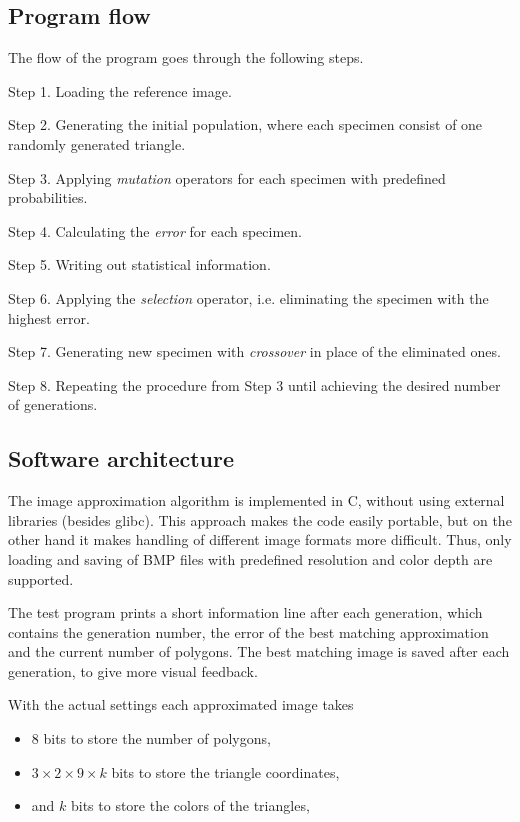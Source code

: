 \documentclass[conference]{IEEEtran}
\begin{document}
\subsection{Program flow}

The flow of the program goes through the following steps.

Step 1. Loading the reference image.

Step 2. Generating the initial population, where each specimen
consist of one randomly generated triangle.

Step 3. Applying \emph{mutation} operators for each specimen
with predefined probabilities.

Step 4. Calculating the \emph{error} for each specimen.

Step 5. Writing out statistical information.

Step 6. Applying the \emph{selection} operator, i.e.
eliminating the specimen with the highest error.

Step 7. Generating new specimen with \emph{crossover}
in place of the eliminated ones.

Step 8. Repeating the procedure from Step 3 until achieving
the desired number of generations.

\subsection{Software architecture}

The image approximation algorithm is implemented in C,
without using external libraries (besides glibc). This
approach makes the code easily portable, but on the other
hand it makes handling of different image formats more
difficult. Thus, only loading and saving of BMP files
with predefined resolution and color depth are supported.

The test program prints a short information line after
each generation, which contains the generation number,
the error of the best matching approximation and the
current number of polygons. The best matching image is
saved after each generation, to give more visual feedback.

With the actual settings each approximated image takes

\begin{itemize}

\item{8 bits to store the number of polygons,}

\item{$3 \times 2 \times 9 \times k$ bits to store the triangle
coordinates,}

\item{and $k$ bits to store the colors of the triangles,}

\end{itemize}
\end{document}
